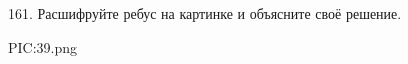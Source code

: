 161. Расшифруйте ребус на картинке и объясните своё решение.
\begin{center}
{{PIC:39.png}}
\end{center}
